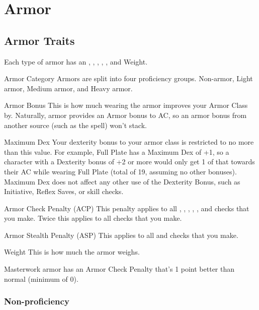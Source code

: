 \section{Armor}

\subsection{Armor Traits}

Each type of armor has an , , , , , and Weight.

\begin{description*}
\item[Armor Category] Armors are split into four proficiency groups. Non-armor, Light armor, Medium armor, and Heavy armor.
\item[Armor Bonus] This is how much wearing the armor improves your Armor Class by. Naturally, armor provides an Armor bonus to AC, so an armor bonus from another source (such as the  spell) won't stack.
\item[Maximum Dex] Your dexterity bonus to your armor class is restricted to no more than this value. For example, Full Plate has a Maximum Dex of +1, so a character with a Dexterity bonus of +2 or more would only get 1 of that towards their AC while wearing Full Plate (total of 19, assuming no other bonuses). Maximum Dex does not affect any other use of the Dexterity Bonus, such as Initiative, Reflex Saves, or skill checks.
\item[Armor Check Penalty (ACP)] This penalty applies to all , , , , , and  checks that you make. Twice this applies to all  checks that you make.
\item[Armor Stealth Penalty (ASP)] This applies to all  and  checks that you make.
\item[Weight] This is how much the armor weighs.
\end{description*}

Masterwork armor has an Armor Check Penalty that's 1 point better than normal (minimum of 0).

\subsubsection{Non-proficiency}

